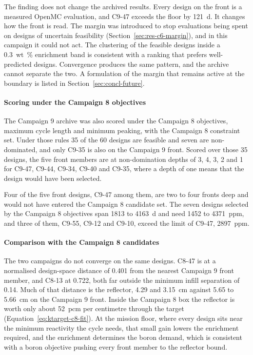 The finding does not change the archived results. Every design on the
front is a measured OpenMC evaluation, and C9-47 exceeds the floor by
\SI{121}{d}. It changes how the front is read. The margin was
introduced to stop evaluations being spent on designs of uncertain
feasibility (Section~\ref{sec:res-c6-margin}), and in this campaign it
could not act. The clustering of the feasible designs inside a
\SI{0.3}{wt\%} enrichment band is consistent with a ranking that
prefers well-predicted designs. Convergence produces the same pattern,
and the archive cannot separate the two. A formulation of the margin
that remains active at the boundary is listed in
Section~\ref{sec:concl-future}.


\paragraph{Scoring under the Campaign 8 objectives}
\label{sec:res-c9-discarded}

The Campaign 9 archive was also scored under the Campaign 8
objectives, maximum cycle length and minimum peaking, with the
Campaign 8 constraint set. Under those rules 35 of the 60 designs are
feasible and seven are non-dominated, and only C9-35 is also on the
Campaign 9 front. Scored over those 35 designs, the five front members
are at non-domination depths of 3, 4, 3, 2 and 1 for C9-47, C9-44,
C9-34, C9-40 and C9-35, where a depth of one means that the design
would have been selected.

Four of the five front designs, C9-47 among them, are two to four
fronts deep and would not have entered the Campaign 8 candidate set.
The seven designs selected by the Campaign 8 objectives span 1813 to
\SI{4163}{d} and need 1452 to \SI{4371}{ppm}, and three of them, C9-55,
C9-12 and C9-10, exceed the limit of C9-47, \SI{2897}{ppm}.

\paragraph{Comparison with the Campaign 8 candidates}
\label{sec:res-c9-compare}

The two campaigns do not converge on the same designs. C8-47 is at a
normalised design-space distance of 0.401 from the nearest Campaign 9 front
member, and C8-13 at 0.722, both far outside the minimum infill separation
of 0.14. Much of that distance is the reflector, 4.29 and \SI{3.15}{cm}
against 5.65 to \SI{5.66}{cm} on the Campaign 9 front. Inside the Campaign 8
box the reflector is worth only about \SI{52}{pcm} per centimetre through
the target (Equation~\eqref{eq:ktarget-c8-fit}). At the mission floor, where
every design sits near the minimum reactivity the cycle needs, that small
gain lowers the enrichment required, and the enrichment determines the
boron demand, which is consistent with a boron objective pushing every front
member to the reflector bound.

